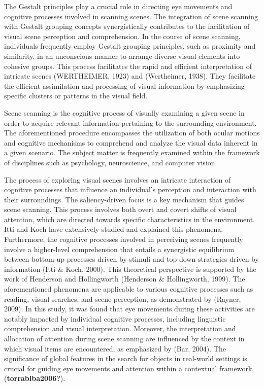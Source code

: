 \documentclass[print]{nuthesis}
\begin{document}
The Gestalt principles play a crucial role in directing eye movements and cognitive processes involved in scanning scenes.
The integration of scene scanning with Gestalt grouping concepts synergistically contributes to the facilitation of visual scene perception and comprehension.
In the course of scene scanning, individuals frequently employ Gestalt grouping principles, such as proximity and similarity, in an unconscious manner to arrange diverse visual elements into cohesive groups.
This process facilitates the rapid and efficient interpretation of intricate scenes (WERTHEIMER, 1923) and (Wertheimer, 1938).
They facilitate the efficient assimilation and processing of visual information by emphasizing specific clusters or patterns in the visual field.

Scene scanning is the cognitive process of visually examining a given scene in order to acquire relevant information pertaining to the surrounding environment.
The aforementioned procedure encompasses the utilization of both ocular motions and cognitive mechanisms to comprehend and analyze the visual data inherent in a given scenario.
The subject matter is frequently examined within the framework of disciplines such as psychology, neuroscience, and computer vision.

The process of exploring visual scenes involves an intricate interaction of cognitive processes that influence an individual's perception and interaction with their surroundings.
The saliency-driven focus is a key mechanism that guides scene scanning.
This process involves both overt and covert shifts of visual attention, which are directed towards specific characteristics in the environment.
Itti and Koch have extensively studied and explained this phenomena.
Furthermore, the cognitive processes involved in perceiving scenes frequently involve a higher-level comprehension that entails a synergistic equilibrium between bottom-up processes driven by stimuli and top-down strategies driven by information (Itti \& Koch, 2000).
This theoretical perspective is supported by the work of Henderson and Hollingworth (Henderson \& Hollingworth, 1999).
The aforementioned phenomena are applicable to various cognitive processes such as reading, visual searches, and scene perception, as demonstrated by (Rayner, 2009).
In this study, it was found that eye movements during these activities are notably impacted by individual cognitive processes, including linguistic comprehension and visual interpretation.
Moreover, the interpretation and allocation of attention during scene scanning are influenced by the context in which visual items are encountered, as emphasized by (Bar, 2004).
The significance of global features in the search for objects in real-world settings is crucial for guiding eye movements and attention within a contextual framework, (\textbf{torrablba2006?}).
\end{document}
